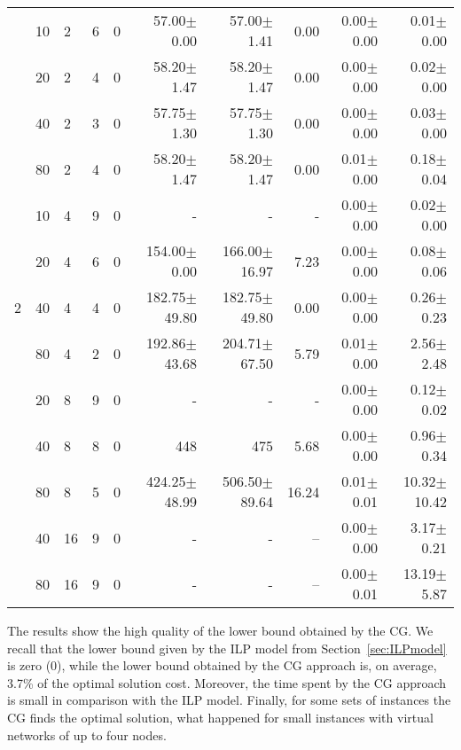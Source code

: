 \documentclass[conference]{IEEEtran}
\begin{document}
\begin{table*}[h]
\begin{center}
\begin{tabular}{c l l| c c r r r r r}
\hline                                                                                          
&10 & 2    & 6 & 0 &  57.00$\pm$0.00        &  57.00$\pm$1.41     &   0.00      &  0.00$\pm$0.00 &  0.01$\pm$0.00        \\
&20 & 2    & 4 & 0 &  58.20$\pm$1.47        &  58.20$\pm$1.47     &   0.00      &  0.00$\pm$0.00 &  0.02$\pm$0.00        \\
&40 & 2    & 3 & 0 &  57.75$\pm$1.30        &  57.75$\pm$1.30     &   0.00      &  0.00$\pm$0.00 &  0.03$\pm$0.00        \\
&80 & 2    & 4 & 0 &  58.20$\pm$1.47        &  58.20$\pm$1.47     &   0.00      &  0.01$\pm$0.00 &  0.18$\pm$0.04        \\
&10 & 4    & 9 & 0 &  -                   &  -                    &   -         &  0.00$\pm$0.00 &  0.02$\pm$0.00        \\
&20 & 4    & 6 & 0 &  154.00$\pm$0.00       &  166.00$\pm$16.97   &   7.23      &  0.00$\pm$0.00 &  0.08$\pm$0.06        \\
2&40 & 4   & 4 & 0 &  182.75$\pm$49.80      &  182.75$\pm$49.80    &  0.00      &  0.00$\pm$0.00 &  0.26$\pm$0.23        \\
&80 & 4    & 2 & 0 &  192.86$\pm$43.68      &  204.71$\pm$67.50   &   5.79      &  0.01$\pm$0.00 &  2.56$\pm$2.48        \\
&20 & 8    & 9 & 0 &  -                     &  -                  &   -         &  0.00$\pm$0.00 &  0.12$\pm$0.02         \\
&40 & 8    & 8 & 0 &  448                   &  475                &  5.68       &  0.00$\pm$0.00 &  0.96$\pm$0.34        \\
&80 & 8    & 5 & 0 &  424.25$\pm$48.99      &  506.50$\pm$89.64   &  16.24      &  0.01$\pm$0.01 &  10.32$\pm$10.42       \\
&40 & 16   & 9 & 0 &  -                     &  -                  &  --         &  0.00$\pm$0.00 &  3.17$\pm$0.21         \\
&80 & 16   & 9 & 0 &  -                     &  -                  &  --         &  0.00$\pm$0.01 &  13.19$\pm$5.87        \\
\end{tabular}
\end{center}
\end{table*}
The results show the high quality of the lower bound obtained by the CG. We recall that the lower bound given by the ILP model from Section~\ref{sec:ILPmodel} is zero (0),
while the lower bound obtained by the CG approach is, on average, 3.7\% of the optimal solution cost.
Moreover, the time spent by the CG approach is small in comparison with the ILP model.
Finally, for some sets of instances the CG finds the optimal solution, what happened for small instances with virtual networks of up to four nodes.
\end{document}
